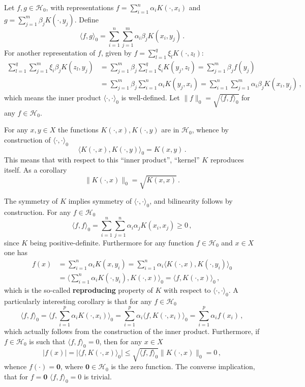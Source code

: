 \documentclass[a4paper]{article}
\newcommand{\nil}{\mathbf{0}}
\newcommand{\Hcal}{\mathcal{H}}
\begin{document}
Let $f,g\in \Hcal_0$, with representations $f = \sum_{i=1}^n \alpha_i K(\cdot, x_i)$ and
$g = \sum_{j=1}^m \beta_j K(\cdot, y_j)$. Define
\[ \langle f, g \rangle_0 = \sum_{i=1}^n \sum_{j=1}^m \alpha_i \beta_j K(x_i, y_j)\,. \]
For another representation of $f$, given by $f = \sum_{l=1}^q \xi_l K(\cdot, z_l)$:
\begin{align*}
	\sum_{l=1}^q \sum_{j=1}^m \xi_i \beta_j K(z_l, y_j)
	&= \sum_{j=1}^m \beta_j \sum_{l=1}^q \xi_i K(y_j, z_l) 
	 = \sum_{j=1}^m \beta_j f(y_j) \\
	&= \sum_{j=1}^m \beta_j \sum_{i=1}^n \alpha_i K(y_j, x_i) 
	 = \sum_{i=1}^n \sum_{j=1}^m \alpha_i \beta_j K(x_i, y_j) \,,
\end{align*}
which means the inner product $\langle \cdot,\cdot \rangle_0$ is well-defined.
Let $\|f\|_0 = \sqrt{\langle f, f\rangle_0}$ for any $f\in \Hcal_0$.

For any $x,y\in X$ the functions $K(\cdot,x), K(\cdot,y)$ are in $\Hcal_0$, whence
by construction of $\langle\cdot,\cdot\rangle_0$
\[ \langle K(\cdot,x), K(\cdot,y) \rangle_0 = K(x,y) \,.\]
This means that with respect to this ``inner product'', ``kernel'' $K$ reproduces itself.
As a corollary 
\[ \| K(\cdot,x) \|_0 = \sqrt{ K(x,x) } \,.\]

The symmetry of $K$ implies symmetry of $\langle \cdot,\cdot \rangle_0$, and
bilinearity follows by construction. For any $f\in \Hcal_0$
\[ \langle f, f \rangle_0 = \sum_{i=1}^n \sum_{j=1}^n \alpha_i \alpha_j K(x_i, x_j) \geq 0\,, \]
since $K$ being positive-definite. Furthermore for any function $f\in \Hcal_0$
and $x\in X$ one has
\begin{align*}
	f(x) &= \sum_{i=1}^n \alpha_i K(x, y_i)
	 = \sum_{i=1}^n \alpha_i \langle K(\cdot,x), K(\cdot,y_i) \rangle_0 \\
	&= \bigl\langle \sum_{i=1}^n \alpha_i K(\cdot,y_i), K(\cdot,x) \bigr\rangle_0 
	 = \langle f, K(\cdot,x) \rangle_0 \,,
\end{align*}
which is the so-called \textbf{reproducing} property of $K$ with respect to
$\langle \cdot,\cdot \rangle_0$. A particularly interesting corollary is that
for any $f\in \Hcal_0$
\[
\langle f, f \rangle_0
= \bigl\langle f, \sum_{i=1}^p \alpha_i K(\cdot, x_i) \bigr\rangle_0
= \sum_{i=1}^p \alpha_i \langle f, K(\cdot, x_i) \rangle_0
= \sum_{i=1}^p \alpha_i f(x_i)\,,
\]
which actually follows from the construction of the inner product. Furthermore,
if $f\in \Hcal_0$ is such that $\langle f, f\rangle_0 = 0$, then for any $x\in X$
\[
|f(x)|
= \bigl| \langle f, K(\cdot,x) \rangle_0 \bigr|
\leq \sqrt{ \langle f,f\rangle_0 } \|K(\cdot,x)\|_0
= 0 \,,
\]
whence $f(\cdot) = \nil$, where $\nil\in \Hcal_0$ is the zero function. The converse
implication, that for $f=\nil$ $\langle f,f\rangle_0 = 0$ is trivial.
\end{document}
